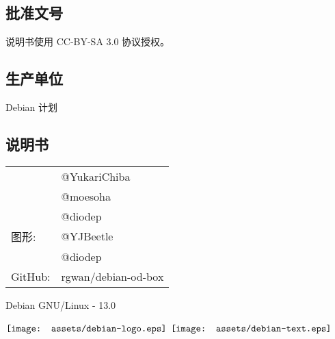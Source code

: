 \documentclass{article}
\begin{document}
\begin{multicols*}{3}
	\medskip


	\begin{tcolorbox}
	\section*{批准文号}
	\end{tcolorbox}

	说明书使用 CC-BY-SA 3.0 协议授权。

	\medskip


	\begin{tcolorbox}
	\section*{生产单位}
	\end{tcolorbox}

	Debian 计划

	\medskip


	\begin{tcolorbox}
	\section*{说明书}
	\end{tcolorbox}
	\begin{tabularx}{\linewidth}{@{}ll@{}}
		\multirow{2}{*}{}{编审：} & @YukariChiba\\
		~ & @moesoha \\
		~ & @diodep \\
		图形: & @YJBeetle\\
		~ & @diodep \\
		GitHub: & rgwan/debian-od-box\\
	\end{tabularx}

	\medskip


	\vfill
	\begin{flushright}
		Debian GNU/Linux - 13.0
		\linebreak
		\newline
		\begin{minipage}{0,5\textwidth}
			\centering
			$\vcenter{\hbox{\texttt{[image: assets/debian-logo.eps]}}}$
			$\vcenter{\hbox{\texttt{[image: assets/debian-text.eps]}}}$
		\end{minipage}
	\end{flushright}

\end{multicols*}
\end{document}
